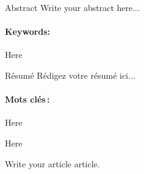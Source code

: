 
\GDabstracts

\begin{GDabstract}{Abstract}
Write your abstract here...

\paragraph{Keywords: }
Here
\end{GDabstract}

\begin{GDabstract}{R\'esum\'e}
R\'edigez votre r\'esum\'e ici...

\paragraph{Mots cl\'es\,: }
Here

\end{GDabstract} 

\begin{GDacknowledgements}
Here

\end{GDacknowledgements}


\GDarticlestart
Write your article article.


\endinput
